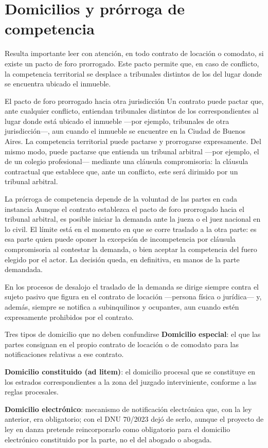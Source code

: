 \documentclass[12pt,oneside]{book}
\begin{document}
\section{Domicilios y prórroga de competencia}

Resulta importante leer con atención, en todo contrato de locación o comodato, si existe un pacto de foro prorrogado. Este pacto permite que, en caso de conflicto, la competencia territorial se desplace a tribunales distintos de los del lugar donde se encuentra ubicado el inmueble.

\begin{example}{El pacto de foro prorrogado hacia otra jurisdicción}
Un contrato puede pactar que, ante cualquier conflicto, entiendan tribunales distintos de los correspondientes al lugar donde está ubicado el inmueble —por ejemplo, tribunales de otra jurisdicción—, aun cuando el inmueble se encuentre en la Ciudad de Buenos Aires. La competencia territorial puede pactarse y prorrogarse expresamente. Del mismo modo, puede pactarse que entienda un tribunal arbitral —por ejemplo, el de un colegio profesional— mediante una cláusula compromisoria: la cláusula contractual que establece que, ante un conflicto, este será dirimido por un tribunal arbitral.
\end{example}

\begin{definition}{La prórroga de competencia depende de la voluntad de las partes en cada instancia}
Aunque el contrato establezca el pacto de foro prorrogado hacia el tribunal arbitral, es posible iniciar la demanda ante la jueza o el juez nacional en lo civil. El límite está en el momento en que se corre traslado a la otra parte: es esa parte quien puede oponer la excepción de incompetencia por cláusula compromisoria al contestar la demanda, o bien aceptar la competencia del fuero elegido por el actor. La decisión queda, en definitiva, en manos de la parte demandada.
\end{definition}

En los procesos de desalojo el traslado de la demanda se dirige siempre contra el sujeto pasivo que figura en el contrato de locación —persona física o jurídica— y, además, siempre se notifica a subinquilinos y ocupantes, aun cuando estén expresamente prohibidos por el contrato.

\begin{definition}{Tres tipos de domicilio que no deben confundirse}
\textbf{Domicilio especial}: el que las partes consignan en el propio contrato de locación o de comodato para las notificaciones relativas a ese contrato.

\textbf{Domicilio constituido (ad litem)}: el domicilio procesal que se constituye en los estrados correspondientes a la zona del juzgado interviniente, conforme a las reglas procesales.

\textbf{Domicilio electrónico}: mecanismo de notificación electrónica que, con la ley anterior, era obligatorio; con el DNU 70/2023 dejó de serlo, aunque el proyecto de ley en danza pretende reincorporarlo como obligatorio para el domicilio electrónico constituido por la parte, no el del abogado o abogada.
\end{definition}
\end{document}
